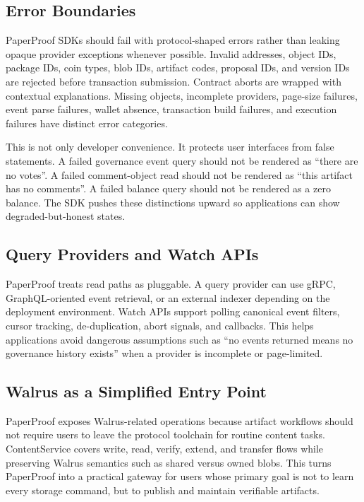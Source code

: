 \documentclass[journal]{IEEEtran}
\begin{document}
\subsection{Error Boundaries}

PaperProof SDKs should fail with protocol-shaped errors rather than leaking opaque provider exceptions whenever possible. Invalid addresses, object IDs, package IDs, coin types, blob IDs, artifact codes, proposal IDs, and version IDs are rejected before transaction submission. Contract aborts are wrapped with contextual explanations. Missing objects, incomplete providers, page-size failures, event parse failures, wallet absence, transaction build failures, and execution failures have distinct error categories.

This is not only developer convenience. It protects user interfaces from false statements. A failed governance event query should not be rendered as ``there are no votes''. A failed comment-object read should not be rendered as ``this artifact has no comments''. A failed balance query should not be rendered as a zero balance. The SDK pushes these distinctions upward so applications can show degraded-but-honest states.

\subsection{Query Providers and Watch APIs}

PaperProof treats read paths as pluggable. A query provider can use gRPC, GraphQL-oriented event retrieval, or an external indexer depending on the deployment environment. Watch APIs support polling canonical event filters, cursor tracking, de-duplication, abort signals, and callbacks. This helps applications avoid dangerous assumptions such as ``no events returned means no governance history exists'' when a provider is incomplete or page-limited.

\subsection{Walrus as a Simplified Entry Point}

PaperProof exposes Walrus-related operations because artifact workflows should not require users to leave the protocol toolchain for routine content tasks. ContentService covers write, read, verify, extend, and transfer flows while preserving Walrus semantics such as shared versus owned blobs. This turns PaperProof into a practical gateway for users whose primary goal is not to learn every storage command, but to publish and maintain verifiable artifacts.
\end{document}

